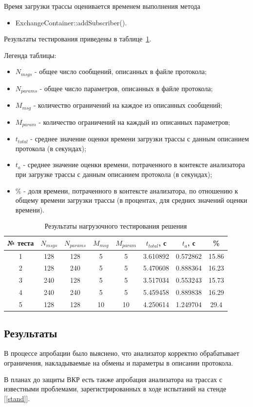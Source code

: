 Время загрузки трассы оценивается временем выполнения метода 

\begin{itemize}
 \item ExchangeContainer::addSubscriber().
\end{itemize}

Результаты тестирования приведены в таблице~\ref{tab:prof}.

Легенда таблицы:

\begin{itemize}
 \item $N_{msgs}$ - общее число сообщений, описанных в файле протокола;
 \item $N_{params}$ - общее число параметров, описанных в файле протокола;
 \item $M_{msg}$ - количество ограничений на каждое из описанных сообщений;
 \item $M_{param}$ - количество ограничений на каждый из описанных параметров;
 \item $t_{total}$ - среднее значение оценки времени загрузки трассы с данным 
описанием протокола (в секундах);
 \item $t_{a}$ - среднее значение оценки времени, потраченного в контексте 
анализатора при загрузке трассы с данным описанием протокола (в секундах);
 \item $\%$ - доля времени, потраченного в контексте анализатора, по 
отношению к общему времени загрузки трассы (в процентах, для средних значений 
оценки времени).
\end{itemize}


\begin{table}[H]
 \centering
 \begin{tabular}{|c|*{7}{c|}}
  \hline
  № теста & $N_{msgs}$ & $N_{params}$ & $M_{msg}$ & $M_{param}$ & $t_{total}$, 
с & $t_{a}$, с & \% \\
  \hline
  1 & 128 & 128 & 5   & 5   & 3.610892 & 0.572862 & 15.86 \\
  2 & 128 & 240 & 5   & 5   & 5.470608 & 0.888364 & 16.23 \\
  3 & 240 & 128 & 5   & 5   & 3.517034 & 0.553243 & 15.73 \\
  4 & 240 & 240 & 5   & 5   & 5.459458 & 0.889838 & 16.29 \\
  5 & 128 & 128 & 10 & 10 & 4.250614 & 1.249704 & 29.4 \\
  \hline
 \end{tabular}
 \caption{Результаты нагрузочного тестирования решения}
 \label{tab:prof}
\end{table}


\subsection{Результаты}

В процессе апробации было выяснено, что анализатор корректно обрабатывает 
ограничения, накладываемые на обмены и параметры в описании протокола.

В планах до защиты ВКР есть также апробация анализатора на трассах с 
известными проблемами, зарегистрированных в ходе испытаний на стенде 
[\ref{stand}].